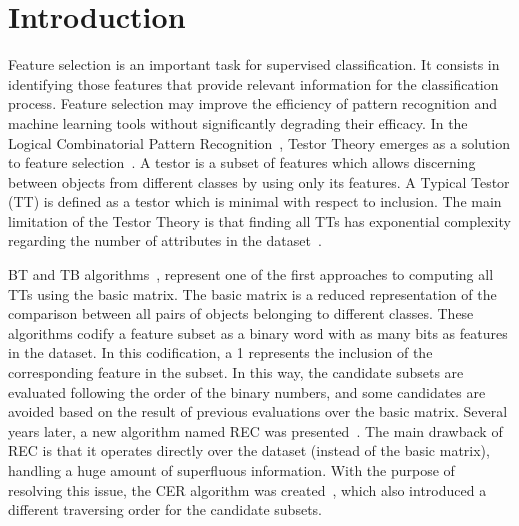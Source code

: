 \documentclass[citenumber]{llncs}
\begin{document}
\section{Introduction}
%
	Feature selection is an important task for supervised classification. It consists in identifying those features that provide relevant information for the classification process. Feature selection may improve the efficiency of pattern recognition and machine learning tools without significantly degrading their efficacy.	In the Logical Combinatorial Pattern Recognition~\cite{Martinez2001}, Testor Theory emerges as a solution to feature selection~\cite{Lazo2001,Shulcloper2008}. A testor is a subset of features which allows discerning between objects from different classes by using only its features. A Typical Testor (TT) is defined as a testor which is minimal with respect to inclusion. The main limitation of the Testor Theory is that finding all TTs has exponential complexity regarding the number of attributes in the dataset~\cite{Chikalov13}.
	
	BT and TB algorithms~\cite{Shulcloper1982}, represent one of the first approaches to computing all TTs using the basic matrix. The basic matrix is a reduced representation of the comparison between all pairs of objects belonging to different classes. These algorithms codify a feature subset as a binary word with as many bits as features in the dataset. In this codification, a 1 represents the inclusion of the corresponding feature in the subset. In this way, the candidate subsets are evaluated following the order of the binary numbers, and some candidates are avoided based on the result of previous evaluations over the basic matrix. Several years later, a new algorithm named REC was presented~\cite{Shulcloper1995b}. The main drawback of REC is that it operates directly over the dataset (instead of the	basic matrix), handling a huge amount of superfluous information. With the purpose of resolving this issue, the CER algorithm was created~\cite{Ayaquica1997}, which also introduced a different traversing order for the candidate subsets.
	
\end{document}
